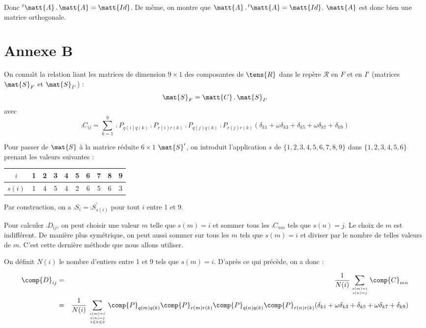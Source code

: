 Donc $^t\matt{A}\,.\,\matt{A}=\matt{Id}$. De m\^eme, on montre que
$\matt{A}\,.\,^t\matt{A}=\matt{Id}$. $\matt{A}$ est donc bien une matrice
orthogonale.


\section{Annexe B}

On conna\^\i t la relation liant les matrices de dimension $9\times1$
des composantes de $\tens{R}$ dans le rep\`ere $\mathcal{R}$ en $F$ et en $I'$
(matrices $\mat{S}_F$ et $\mat{S}_{I'}$) :
\begin{equation}
\mat{S}_F=\matt{C}\,.\,\mat{S}_{I'}
\end{equation}
avec
\begin{equation}
\comp{C}_{ij}=\sum_{k=1}^9
\comp{P}_{q(i)q(k)}\comp{P}_{r(i)r(k)}\comp{P}_{q(j)q(k)}\comp{P}_{r(j)r(k)}
(\delta_{k1}+\omega\delta_{k3}+\delta_{k5}+\omega\delta_{k7}+\delta_{k9})
\end{equation}

Pour passer de $\mat{S}$ \`a la matrice r\'eduite $6\times 1$ $\mat{S}^\prime$,
on introduit l'application $s$ de $\{1,2,3,4,5,6,7,8,9\}$ dans
$\{1,2,3,4,5,6\}$ prenant les valeurs suivantes :
\begin{center}
\begin{tabular}{|c|c|c|c|c|c|c|c|c|c|}
\hline
$i$&1&2&3&4&5&6&7&8&9\\
\hline
$s(i)$&1&4&5&4&2&6&5&6&3\\
\hline
\end{tabular}
\end{center}
Par construction, on a $\comp{S}_i=\comp{S}^\prime_{s(i)}$ pour tout $i$ entre 1
et 9.

Pour calculer $\comp{D}_{ij}$, on peut choisir une valeur $m$ telle que
$s(m)=i$ et sommer tous les $\comp{C}_{mn}$ tels que $s(n)=j$. Le choix de $m$
est indiff\'erent. De mani\`ere plus sym\'etrique, on peut aussi sommer sur tous
les $m$ tels que $s(m)=i$ et diviser par le nombre de telles valeurs de $m$. C'est
cette derni\`ere m\'ethode que nous allons utiliser.

On d\'efinit $N(i)$ le nombre d'entiers entre 1 et 9 tels que
$s(m)=i$. D'apr\`es ce qui pr\'ec\`ede, on a donc :

\begin{eqnarray}
\comp{D}_{ij}&=&\frac{1}{N(i)}\sum_{s(m)=i \atop s(n)=j}\comp{C}_{mn}\nonumber\\
&=&\frac{1}{N(i)}\sum_{{s(m)=i \atop s(n)=j}\atop 1\leqslant k\leqslant 9}
\comp{P}_{q(m)q(k)}\comp{P}_{r(m)r(k)}\comp{P}_{q(n)q(k)}\comp{P}_{r(n)r(k)}
(\delta_{k1}+\omega\delta_{k3}+\delta_{k5}+\omega\delta_{k7}+\delta_{k9})
\end{eqnarray}

